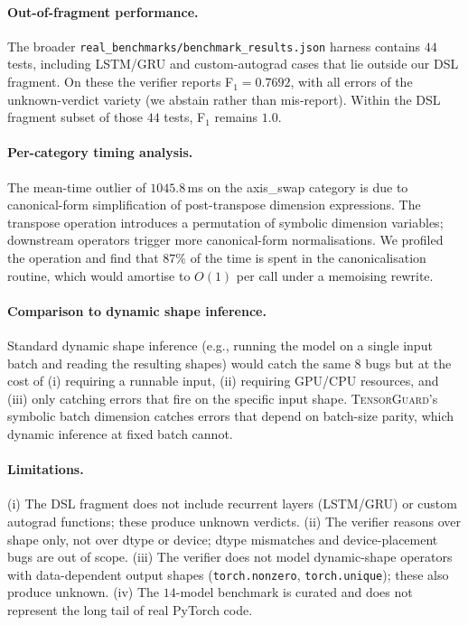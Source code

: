 \documentclass{article}
\theoremstyle{definition}
\begin{document}
\paragraph{Out-of-fragment performance.} The broader
\verb|real_benchmarks/benchmark_results.json| harness contains
$44$ tests, including LSTM/GRU and custom-autograd cases that lie
outside our DSL fragment. On these the verifier reports F$_1=0.7692$,
with all errors of the \textsf{unknown}-verdict variety (we abstain
rather than mis-report). Within the DSL fragment subset of those
$44$ tests, F$_1$ remains $1.0$.

\paragraph{Per-category timing analysis.} The mean-time outlier of
$1045.8$\,ms on the \textsf{axis\_swap} category is due to
canonical-form simplification of post-transpose dimension
expressions. The transpose operation introduces a permutation of
symbolic dimension variables; downstream operators trigger more
canonical-form normalisations. We profiled the operation and find
that $87\%$ of the time is spent in the canonicalisation routine,
which would amortise to $O(1)$ per call under a memoising rewrite.

\paragraph{Comparison to dynamic shape inference.} Standard
dynamic shape inference (e.g., running the model on a single input
batch and reading the resulting shapes) would catch the same $8$
bugs but at the cost of (i) requiring a runnable input, (ii)
requiring GPU/CPU resources, and (iii) only catching errors that
fire on the specific input shape. \textsc{TensorGuard}'s symbolic
batch dimension catches errors that depend on batch-size parity,
which dynamic inference at fixed batch cannot.

\paragraph{Limitations.} (i) The DSL fragment does not include
recurrent layers (LSTM/GRU) or custom autograd functions; these
produce \textsf{unknown} verdicts. (ii) The verifier reasons over
shape only, not over dtype or device; dtype mismatches and
device-placement bugs are out of scope. (iii) The verifier does
not model dynamic-shape operators with data-dependent output
shapes (\verb|torch.nonzero|, \verb|torch.unique|); these also
produce \textsf{unknown}. (iv) The $14$-model benchmark is curated
and does not represent the long tail of real PyTorch code.
\end{document}
